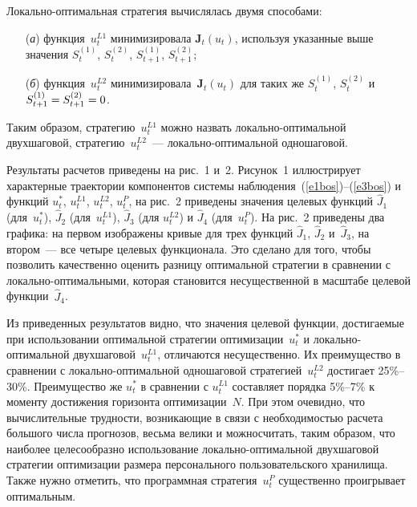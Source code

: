 \begin{multicols}{2}

  Локально-оптимальная стратегия вычислялась двумя способами: 
  \begin{itemize} %
  \item[(\textit{а})] функция~$u_t^{L1}$ 
минимизировала $\mathbf{J}_t(u_t)$, используя указанные выше значения $S_t^{(1)}$, 
$S_t^{(2)}$, $S_{t+1}^{(1)}$, $S_{t+1}^{(2)}$; 
\item[(\textit{б})] функция~$u_t^{L2}$ 
минимизировала~$\mathbf{J}_t(u_t)$ для таких же $S_t^{(1)}$, $S_t^{(2)}$ и 
$S_{t+1}^{(1)}\hm=S_{t+1}^{(2)}\hm=0$.
\end{itemize}


Таким образом, стратегию~$u_t^{L1}$ можно 
назвать ло\-каль\-но-оп\-ти\-маль\-ной двухшаговой, стратегию~$u_t^{L2}$~--- 
  ло\-каль\-но-опти\-маль\-ной одношаговой. 
  
  Результаты расчетов приведены на рис.~1 и~2. 
Рисунок~1 иллюстрирует характерные траектории компонентов системы 
наблюдения~(\ref{e1bos})--(\ref{e3bos}) и функций $u_t^*$, $u_t^{L1}$, $u_t^{L2}$, $u_t^P$, 
на рис.~2 приведены значения целевых функций $\hat{J}_1$ (для~$u_t^*$), $\hat{J}_2$ 
(для~$u_t^{L1}$), $\hat{J}_3$ (для $u_t^{L2}$) и $\hat{J}_4$ (для~$u_t^P$). На 
рис.~2 приведены два графика: на первом изображены кривые для трех функций $\hat{J}_1$, 
$\hat{J}_2$ и~$\hat{J}_3$, на втором~--- все четыре целевых функционала. Это сделано для 
того, чтобы позволить качественно оценить разницу оптимальной стратегии в сравнении с 
локально-оптимальными, которая становится несущественной в масштабе целевой 
функции~$\hat{J}_4$.


  Из приведенных результатов видно, что значения целевой функции, достигаемые при 
использовании оптимальной стратегии оптимизации~$u_t^*$ и ло\-каль\-но-опти\-маль\-ной 
двухшаговой~$u_t^{L1}$, отличаются несущественно. Их преимущество в сравнении с 
локально-оптимальной одношаговой стратегией~$u_t^{L2}$ достигает 25\%--30\%. 
Преимущество же $u_t^*$ в сравнении с $u_t^{L1}$ составляет порядка 5\%--7\% к моменту 
достижения горизонта оптимизации~$N$. При этом очевидно, что вычислительные 
труд\-ности, возникающие в связи с необходимостью расчета большого числа прогнозов, 
весьма велики и можно\linebreak считать, таким образом, что наиболее целесообразно использование 
локально-оптимальной двухшаговой стратегии оптимизации размера персонального 
пользовательского хранилища. Также \mbox{нужно} отметить, что программная стратегия~$u_t^P$ 
существенно проигрывает оптимальным.


\end{multicols}
